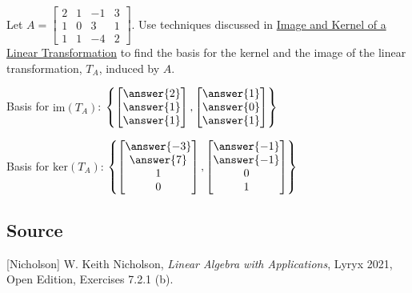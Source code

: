 \documentclass{ximera}
\author{}
\begin{document}
\begin{exercise}
Let $A=\begin{bmatrix}2 & 1 & -1 & 3\\1 & 0 & 3 & 1\\1 & 1 & -4 & 2\end{bmatrix}$.  Use techniques discussed in \href{https://ximera.osu.edu/linearalgebrav3/LinearAlgebraInteractiveIntro/LTR-0050/main}{Image and Kernel of a Linear Transformation} to find the basis for the kernel and the image of the linear transformation, $T_A$, induced by $A$.

Basis for $\mbox{im}(T_A)$: $\left\{\begin{bmatrix}\answer{2}\\\answer{1}\\\answer{1}\end{bmatrix}, \begin{bmatrix}\answer{1}\\\answer{0}\\\answer{1}\end{bmatrix}\right\}$

Basis for $\mbox{ker}(T_A)$: $\left\{\begin{bmatrix}\answer{-3}\\\answer{7}\\1\\0\end{bmatrix}, \begin{bmatrix}\answer{-1}\\\answer{-1}\\0\\1\end{bmatrix}\right\}$

 \end{exercise}

 \subsection*{Source}
[Nicholson] W. Keith Nicholson, {\it Linear Algebra with Applications}, Lyryx 2021, Open Edition, Exercises 7.2.1 (b). 
 
\end{document}
